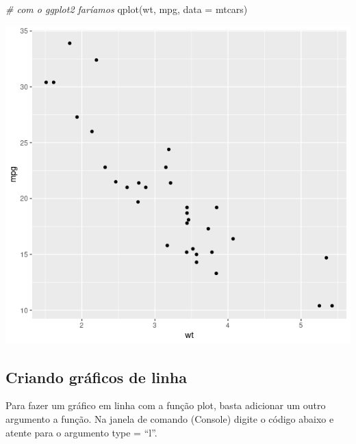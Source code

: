 \documentclass[
]{book}
\newenvironment{Shaded}{\begin{snugshade}}{\end{snugshade}}
\newcommand{\AttributeTok}[1]{\textcolor[rgb]{0.77,0.63,0.00}{#1}}
\newcommand{\CommentTok}[1]{\textcolor[rgb]{0.56,0.35,0.01}{\textit{#1}}}
\newcommand{\FunctionTok}[1]{\textcolor[rgb]{0.00,0.00,0.00}{#1}}
\newcommand{\NormalTok}[1]{#1}
\newcommand{\SpecialCharTok}[1]{\textcolor[rgb]{0.00,0.00,0.00}{#1}}
\newcommand{\StringTok}[1]{\textcolor[rgb]{0.31,0.60,0.02}{#1}}
\begin{document}
\begin{Shaded}
\begin{Highlighting}[]
\CommentTok{\# com o ggplot2 faríamos}
\FunctionTok{qplot}\NormalTok{(wt, mpg, }\AttributeTok{data =}\NormalTok{ mtcars)}
\end{Highlighting}
\end{Shaded}

\includegraphics{figure/g2.png}

\hypertarget{criando-gruxe1ficos-de-linha}{%
\subsection{Criando gráficos de linha}\label{criando-gruxe1ficos-de-linha}}

Para fazer um gráfico em linha com a função plot, basta adicionar um outro argumento a função. Na janela de comando (Console) digite o código abaixo e atente para o argumento type = ``l''.

\begin{Shaded}
\end{Shaded}
\end{document}
